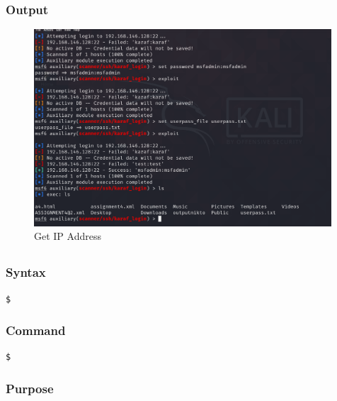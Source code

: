 \documentclass[11pt]{article}
\begin{document}
\subsubsection*{Output}
\begin{figure}[H]
    \centering
    \includegraphics[width=0.99\textwidth]{a3_ss (26).png}
    \caption{Get IP Address}
    \label{fig:1}
\end{figure}
\subsection{}

\subsubsection*{Syntax}
\begin{verbatim}
$
\end{verbatim}

\subsubsection*{Command}
\begin{verbatim}
$
\end{verbatim}

\subsubsection*{Purpose}
\end{document}
